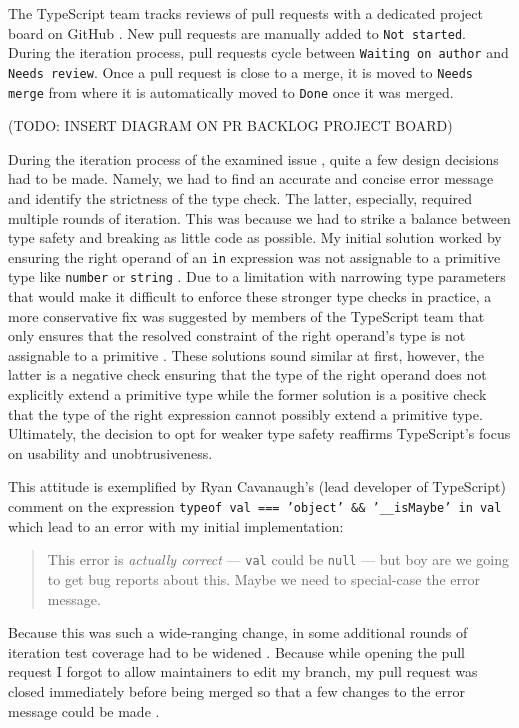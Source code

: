 \documentclass[12pt]{scrartcl}
\def\code#1{\texttt{\frenchspacing#1}}
\begin{document}
The TypeScript team tracks reviews of pull requests with a dedicated project board on GitHub \cite{PRBacklog}. New pull requests are manually added to \code{Not started}. During the iteration process, pull requests cycle between \code{Waiting on author} and \code{Needs review}. Once a pull request is close to a merge, it is moved to \code{Needs merge} from where it is automatically moved to \code{Done} once it was merged.

(TODO: INSERT DIAGRAM ON PR BACKLOG PROJECT BOARD)

During the iteration process of the examined issue \cite{41928}, quite a few design decisions had to be made. Namely, we had to find an accurate and concise error message and identify the strictness of the type check. The latter, especially, required multiple rounds of iteration. This was because we had to strike a balance between type safety and breaking as little code as possible. My initial solution worked by ensuring the right operand of an \code{in} expression was not assignable to a primitive type like \code{number} or \code{string} \cite{41928Comment1}. Due to a limitation with narrowing type parameters \cite{13995} that would make it difficult to enforce these stronger type checks in practice, a more conservative fix was suggested by members of the TypeScript team that only ensures that the resolved constraint of the right operand's type is not assignable to a primitive \cite{41928Comment2}. These solutions sound similar at first, however, the latter is a negative check ensuring that the type of the right operand does not explicitly extend a primitive type while the former solution is a positive check that the type of the right expression cannot possibly extend a primitive type. Ultimately, the decision to opt for weaker type safety reaffirms TypeScript's focus on usability and unobtrusiveness.

This attitude is exemplified by Ryan Cavanaugh's (lead developer of TypeScript) comment on the expression \code{typeof val === 'object' \&\& '\_\_isMaybe' in val} which lead to an error with my initial implementation:

\begin{quote}
    This error is \textit{actually correct} --- \code{val} could be \code{null} --- but boy are we going to get bug reports about this. Maybe we need to special-case the error message. \cite{41928Comment3}
\end{quote}

Because this was such a wide-ranging change, in some additional rounds of iteration test coverage had to be widened \cite{41928Comment4}. Because while opening the pull request I forgot to allow maintainers to edit my branch, my pull request was closed immediately before being merged so that a few changes to the error message could be made \cite{42288}.
\end{document}
